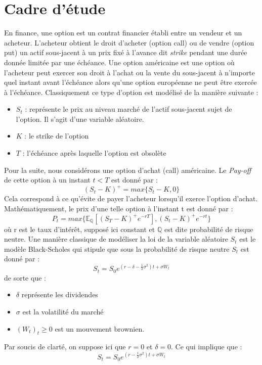 \documentclass[12pt,french]{article}
\begin{document}
\section{Cadre d'étude}
En finance, une option est un contrat financier établi entre un vendeur et un acheteur. L'acheteur obtient le droit d'acheter (option call) ou de vendre (option put) un actif sous-jacent à un prix fixé à l'avance dit \textit{strike} pendant une durée donnée limitée par une échéance. \newline
Une option américaine est une option où l'acheteur peut exercer son droit à l'achat ou la vente du sous-jacent à n'importe quel instant avant l'échéance alors qu'une option européenne ne peut être exercée à l'échéance.  \newline
Classiquement ce type d'option est modélisé de la manière suivante :
\begin{itemize}
\item $S_t$ : représente le prix au niveau marché de l'actif sous-jacent sujet de l'option. Il s'agit d'une variable aléatoire.
\item $K$ : le strike de l'option
\item $T$ : l'échéance après laquelle l'option est obsolète
\end{itemize}
Pour la suite, nous considérons une option d'achat (call) américaine. Le \textit{Pay-off} de cette option à un instant $t<T$ est donné par : $$ (S_t-K)^+ = max\{S_t-K,0\}$$
Cela correspond à ce qu'évite de payer l'acheteur lorsqu'il exerce l'option d'achat. \newline
Mathématiquement, le prix d'une telle option à l'instant t est donné par :
$$ P_t = max\{\mathbb{E}_{\mathbb{Q}}[(S_T-K)^+ e^{-rT}], (S_t-K)^+ e^{-rt}\}$$
où r est le taux d'intérêt, supposé ici constant et $\mathbb{Q}$ est dite probabilité de risque neutre.
Une manière classique de modéliser la loi de la variable aléatoire $S_t$ est le modèle Black-Scholes qui stipule que sous la probabilité de risque neutre $S_t$ est donné par :
$$
	S_t = S_0 e^{(r-\delta-\frac{1}{2} \sigma^2)t+\sigma W_t}
$$
de sorte que : 
\begin{itemize}
\item $\delta$ représente les dividendes
\item $\sigma$ est la volatilité du marché
\item $(W_t)_t\geq0$ est un mouvement brownien.
\end{itemize}
Par soucis de clarté, on suppose ici que $r=0$ et $\delta = 0$. Ce qui implique que :
$$ 
	S_t = S_0 e^{(r-\frac{1}{2} \sigma^2)t+\sigma W_t}
$$
\end{document}
